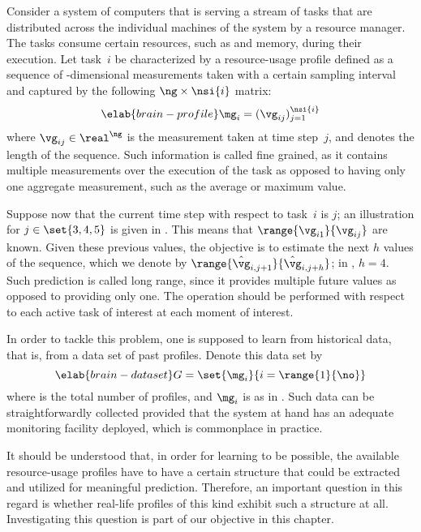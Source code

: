 Consider a system of computers that is serving a stream of tasks that are
distributed across the individual machines of the system by a resource manager.
The tasks consume certain resources, such as  and memory, during their
execution. Let task~$i$ be characterized by a resource-usage profile defined as
a sequence of \ng-dimensional measurements taken with a certain sampling
interval and captured by the following $\ng \times \nsi{i}$ matrix:
\begin{equation} \elab{brain-profile}
  \mg_i = (\vg_{ij})_{j = 1}^\nsi{i}
\end{equation}
where $\vg_{ij} \in \real^\ng$ is the measurement taken at time step~$j$, and
 denotes the length of the sequence. Such information is called fine
grained, as it contains multiple measurements over the execution of the task as
opposed to having only one aggregate measurement, such as the average or maximum
value.

Suppose now that the current time step with respect to task~$i$ is $j$; an
illustration for $j \in \set{3, 4, 5}$ is given in .
This means that $\range{\vg_{i1}}{\vg_{ij}}$ are known. Given these previous
values, the objective is to estimate the next $h$ values of the sequence, which
we denote by $\range{\hat{\vg}_{i, j + 1}}{\hat{\vg}_{i, j + h}}$; in
, $h = 4$. Such prediction is called long range, since
it provides multiple future values as opposed to providing only one. The
operation should be performed with respect to each active task of interest at
each moment of interest.

In order to tackle this problem, one is supposed to learn from historical data,
that is, from a data set of past profiles. Denote this data set by
\begin{equation} \elab{brain-dataset}
  G = \set{\mg_i}{i = \range{1}{\no}}
\end{equation}
where \no is the total number of profiles, and $\mg_i$ is as in
. Such data can be straightforwardly collected provided that
the system at hand has an adequate monitoring facility deployed, which is
commonplace in practice.

It should be understood that, in order for learning to be possible, the
available resource-usage profiles have to have a certain structure that could be
extracted and utilized for meaningful prediction. Therefore, an important
question in this regard is whether real-life profiles of this kind exhibit such
a structure at all. Investigating this question is part of our objective in this
chapter.
